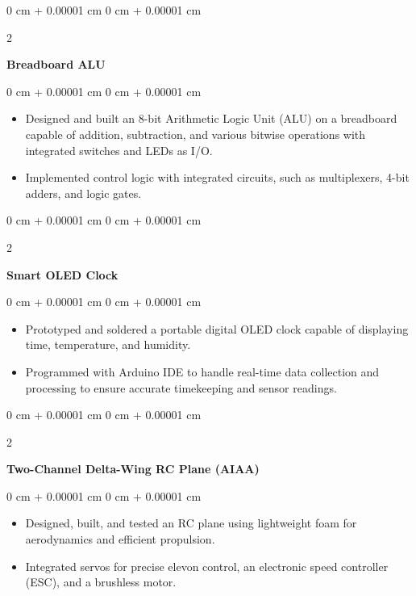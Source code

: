 \documentclass[10pt, letterpaper]{article}
\newenvironment{highlights}{
    \begin{itemize}[
        topsep=0.10 cm,
        parsep=0.10 cm,
        partopsep=0pt,
        itemsep=0pt,
        leftmargin=0 cm + 10pt
    ]
}{
    \end{itemize}
} %
\newenvironment{onecolentry}{
    \begin{adjustwidth}{
        0 cm + 0.00001 cm
    }{
        0 cm + 0.00001 cm
    }
}{
    \end{adjustwidth}
} %
\newenvironment{twocolentry}[2][]{
    \onecolentry
    \def\secondColumn{#2}
    \setcolumnwidth{\fill, 4.5 cm}
    \begin{paracol}{2}
}{
    \switchcolumn \raggedleft \secondColumn
    \end{paracol}
    \endonecolentry
} %
\begin{document}
        
        \begin{twocolentry}{
        }
            \textbf{Breadboard ALU}\end{twocolentry}

        \begin{onecolentry}
            \begin{highlights}
                \item 
Designed and built an 8-bit Arithmetic Logic Unit (ALU) on a breadboard capable of addition, subtraction, and various bitwise operations with integrated switches and LEDs as I/O. 

                \item 
Implemented control logic with integrated circuits, such as multiplexers, 4-bit adders, and logic gates.
            \end{highlights}
        \end{onecolentry}


        \vspace{0.2 cm}

        \begin{twocolentry}{
        }
            \textbf{Smart OLED Clock}\end{twocolentry}

        \begin{onecolentry}
            \begin{highlights}
                \item 
Prototyped and soldered a portable digital OLED clock capable of displaying time, temperature, and humidity. 

                \item 
Programmed with Arduino IDE to handle real-time data collection and processing to ensure accurate timekeeping and sensor readings. 

            \end{highlights}
        \end{onecolentry}


        \vspace{0.2 cm}

        \begin{twocolentry}{
            
        }
\textbf{Two-Channel Delta-Wing RC Plane (AIAA) }
\end{twocolentry}

        \begin{onecolentry}
            \begin{highlights}
                \item 
Designed, built, and tested an RC plane using lightweight foam for aerodynamics and efficient propulsion. 

                \item Integrated servos for precise elevon control, an electronic speed controller (ESC), and a brushless motor. 

            \end{highlights}
        \end{onecolentry}
\end{document}
